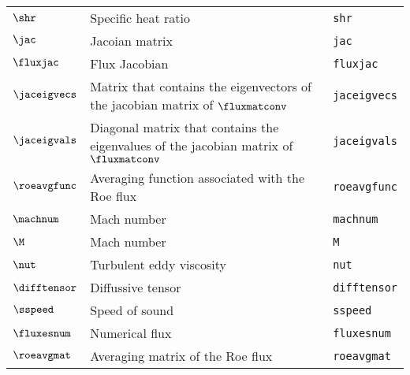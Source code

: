 \begin{tabular}{l l l}
$\shr$ & Specific heat ratio& \texttt{shr}\\
$\jac$ & Jacoian matrix& \texttt{jac}\\
$\fluxjac$ & Flux Jacobian& \texttt{fluxjac}\\
$\jaceigvecs$ & Matrix that contains the eigenvectors of the jacobian matrix of $\fluxmatconv$& \texttt{jaceigvecs}\\
$\jaceigvals$ & Diagonal matrix that contains the eigenvalues of the jacobian matrix of $\fluxmatconv$& \texttt{jaceigvals}\\
$\roeavgfunc$ & Averaging function associated with the Roe flux& \texttt{roeavgfunc}\\
$\machnum$ & Mach number& \texttt{machnum}\\
$\M$ & Mach number& \texttt{M}\\
$\nut$ & Turbulent eddy viscosity& \texttt{nut}\\
$\difftensor$ & Diffussive tensor& \texttt{difftensor}\\
$\sspeed$ & Speed of sound& \texttt{sspeed}\\
$\fluxesnum$ & Numerical flux& \texttt{fluxesnum}\\
$\roeavgmat$ & Averaging matrix of the Roe flux& \texttt{roeavgmat}\\
\end{tabular}

